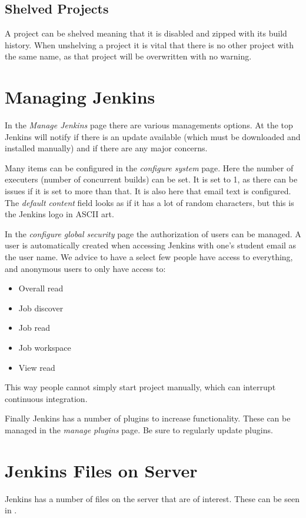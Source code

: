 \subsection{Shelved Projects}
A project can be shelved meaning that it is disabled and zipped with its build history. When unshelving a project it is vital that there is no other project with the same name, as that project will be overwritten with no warning.

\section{Managing Jenkins}
In the \emph{Manage Jenkins} page there are various managements options. At the top Jenkins will notify if there is an update available (which must be downloaded and installed manually) and if there are any major concerns.

Many items can be configured in the \emph{configure system} page. Here the number of executers (number of concurrent builds) can be set. It is set to 1, as there can be issues if it is set to more than that. It is also here that email text is configured. The \emph{default content} field looks as if it has a lot of random characters, but this is the Jenkins logo in ASCII art.

In the \emph{configure global security} page the authorization of users can be managed. A user is automatically created when accessing Jenkins with one's student email as the user name. We advice to have a select few people have access to everything, and anonymous users to only have access to:

\begin{multicols}{3}
\begin{itemize}
  \item Overall read
  \item Job discover
  \item Job read
  \item Job workspace
  \item View read
\end{itemize}
\end{multicols}

This way people cannot simply start project manually, which can interrupt continuous integration.

Finally Jenkins has a number of plugins to increase functionality. These can be managed in the \emph{manage plugins} page. Be sure to regularly update plugins.

\section{Jenkins Files on Server}
Jenkins has a number of files on the server that are of interest. These can be seen in .

